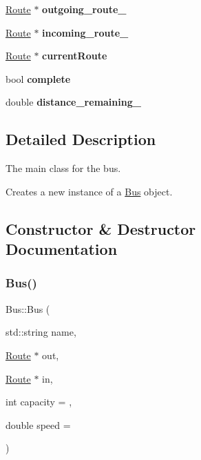 \begin{figure}[H]
\begin{center}
\begin{DoxyCompactItemize}
\mbox{\label{classBus_a625684b3e464f90f822f6303d6113b49}} 
\hyperlink{classRoute}{Route} $\ast$ {\bfseries outgoing\+\_\+route\+\_\+}
\item 
\mbox{\label{classBus_a393eb8015c87cc306a4ce18bf3f19956}} 
\hyperlink{classRoute}{Route} $\ast$ {\bfseries incoming\+\_\+route\+\_\+}
\item 
\mbox{\label{classBus_a0a220de5b56257d6835ae58a95f2c352}} 
\hyperlink{classRoute}{Route} $\ast$ {\bfseries current\+Route}
\item 
\mbox{\label{classBus_ae8b6cf1028a4f5dffd82c1423f17e58e}} 
bool {\bfseries complete}
\item 
\mbox{\label{classBus_ae0e153e41426834bb6c15ffa90bca417}} 
double {\bfseries distance\+\_\+remaining\+\_\+}
\end{DoxyCompactItemize}


\subsection{Detailed Description}
The main class for the bus. 

Creates a new instance of a \hyperlink{classBus}{Bus} object. 

\subsection{Constructor \& Destructor Documentation}
\mbox{\label{classBus_aa28c3c318b6993f3a3aebf211daa9217}} 
\subsubsection{\texorpdfstring{Bus()}{Bus()}}
{\footnotesize\ttfamily Bus\+::\+Bus (\begin{DoxyParamCaption}\item[{std\+::string}]{name,  }\item[{\hyperlink{classRoute}{Route} $\ast$}]{out,  }\item[{\hyperlink{classRoute}{Route} $\ast$}]{in,  }\item[{int}]{capacity = {},  }\item[{double}]{speed = {} }\end{DoxyParamCaption})}




\end{center}
\end{figure}
